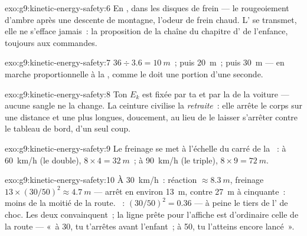 \begin{solution}{exo:g9:kinetic-energy-safety:6}
En , dans les disques de frein --- le rougeoiement d'ambre
après une descente de montagne, l'odeur de frein chaud. L' se
transmet, elle ne s'efface jamais~: la proposition de la chaîne du
chapitre d' de l'enfance, toujours aux commandes.
\end{solution}

\begin{solution}{exo:g9:kinetic-energy-safety:7}
$36 \div 3.6 = \qty{10}{m}$~; puis \qty{20}{m}~; puis \qty{30}{m} ---
en marche proportionnelle à la , comme le doit une portion
d'une seconde.
\end{solution}

\begin{solution}{exo:g9:kinetic-energy-safety:8}
Ton $E_k$ est fixée par ta  et par la  de la voiture ---
aucune sangle ne la change. La ceinture civilise la \emph{retraite}~:
elle arrête le corps sur une distance et une  plus longues,
doucement, au lieu de le laisser s'arrêter contre le tableau de bord,
d'un seul coup.
\end{solution}

\begin{solution}{exo:g9:kinetic-energy-safety:9}
Le freinage se met à l'échelle du carré de la ~: à
\qty{60}{km/h} (le double), $8 \times 4 = \qty{32}{m}$~; à
\qty{90}{km/h} (le triple), $8 \times 9 = \qty{72}{m}$.
\end{solution}

\begin{solution}{exo:g9:kinetic-energy-safety:10}
À \qty{30}{km/h}~: réaction $\approx \qty{8.3}{m}$, freinage
$13 \times (30/50)^2 \approx \qty{4.7}{m}$ --- arrêt en environ
\qty{13}{m}, contre \qty{27}{m} à cinquante~: moins de la moitié de
la route. ~: $(30/50)^2 = 0.36$ --- à peine le tiers de
l' de choc. Les deux convainquent~; la ligne prête pour
l'affiche est d'ordinaire celle de la route --- «~à 30, tu t'arrêtes
avant l'enfant~; à 50, tu l'atteins encore lancé~».
\end{solution}

